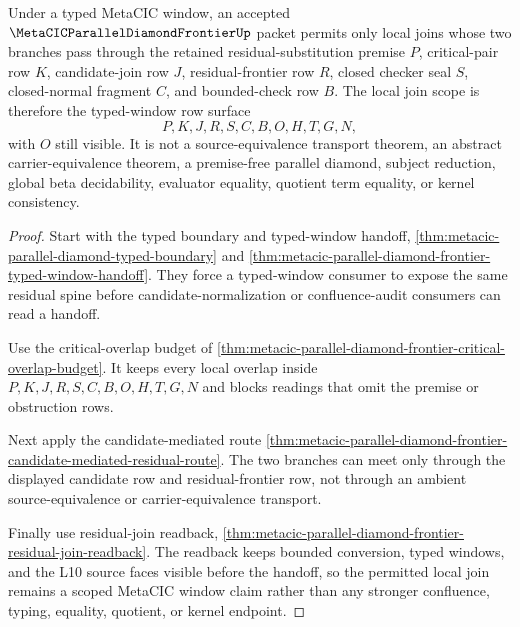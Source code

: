 \begin{theorem}
\label{thm:metacic-parallel-diamond-frontier-local-join-scope}
Under a typed MetaCIC window, an accepted $\MetaCICParallelDiamondFrontierUp$ packet permits only local joins whose two branches pass through the retained residual-substitution premise $P$, critical-pair row $K$, candidate-join row $J$, residual-frontier row $R$, closed checker seal $S$, closed-normal fragment $C$, and bounded-check row $B$. The local join scope is therefore the typed-window row surface
$$
P,K,J,R,S,C,B,O,H,T,G,N ,
$$
with $O$ still visible. It is not a source-equivalence transport theorem, an abstract carrier-equivalence theorem, a premise-free parallel diamond, subject reduction, global beta decidability, evaluator equality, quotient term equality, or kernel consistency.
\end{theorem}
\begin{proof}
Start with the typed boundary and typed-window handoff, \autoref{thm:metacic-parallel-diamond-typed-boundary} and \autoref{thm:metacic-parallel-diamond-frontier-typed-window-handoff}. They force a typed-window consumer to expose the same residual spine before candidate-normalization or confluence-audit consumers can read a handoff.

Use the critical-overlap budget of \autoref{thm:metacic-parallel-diamond-frontier-critical-overlap-budget}. It keeps every local overlap inside $P,K,J,R,S,C,B,O,H,T,G,N$ and blocks readings that omit the premise or obstruction rows.

Next apply the candidate-mediated route \autoref{thm:metacic-parallel-diamond-frontier-candidate-mediated-residual-route}. The two branches can meet only through the displayed candidate row and residual-frontier row, not through an ambient source-equivalence or carrier-equivalence transport.

Finally use residual-join readback, \autoref{thm:metacic-parallel-diamond-frontier-residual-join-readback}. The readback keeps bounded conversion, typed windows, and the L10 source faces visible before the handoff, so the permitted local join remains a scoped MetaCIC window claim rather than any stronger confluence, typing, equality, quotient, or kernel endpoint.
\end{proof}

